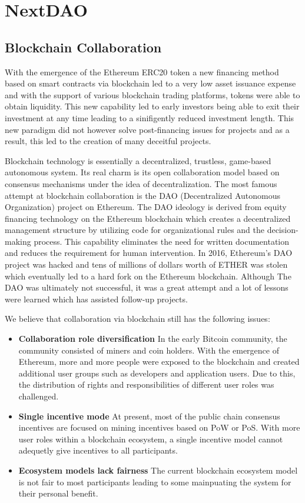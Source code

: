 \section{NextDAO}
\subsection{Blockchain Collaboration}
With the emergence of the Ethereum ERC20 token a new financing method based on smart contracts via blockchain  led to a very low asset issuance expense and with the support of various blockchain trading platforms, tokens were able to obtain liquidity. This new capability led to early investors being able to exit their investment at any time leading to a sinifigently reduced investment length. This new paradigm did not however solve post-financing issues for projects and as a result, this led to the creation of many deceitful projects.

Blockchain technology is essentially a decentralized, trustless, game-based autonomous system. Its real charm is its open collaboration model based on consensus mechanisms under the idea of decentralization. The most famous attempt at blockchain collaboration is the DAO (Decentralized Autonomous Organization) project on Ethereum. The DAO ideology is derived from equity financing technology on the Ethereum blockchain which creates a decentralized management structure by utilizing code for organizational rules and the decision-making process. This capability eliminates the need for written documentation and reduces the requirement for human intervention. In 2016, Ethereum's DAO project was hacked and tens of millions of dollars worth of ETHER was stolen which eventually led to a hard fork on the Ethereum blockchain. Although The DAO was ultimately not successful, it was a great attempt and a lot of lessons were learned which has assisted follow-up projects.

We believe that collaboration via blockchain still has the following issues:
\begin{itemize}
	\item \textbf{Collaboration role diversification}
	In the early Bitcoin community, the community consisted of miners and coin holders. With the emergence of Ethereum, more and more people were exposed to the blockchain and created additional user groups such as developers and application users. Due to this, the distribution of rights and responsibilities of different user roles was challenged.
	\item \textbf{Single incentive mode}
	At present, most of the public chain consensus incentives are focused on mining incentives based on PoW or PoS. With more user roles within a blockchain ecosystem, a single incentive model cannot adequetly give incentives to all participants.
	\item \textbf{Ecosystem models lack fairness}
	The current blockchain ecosystem model is not fair to most participants leading to some mainpuating the system for their personal benefit.
\end{itemize}

